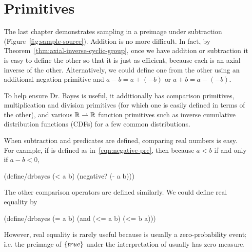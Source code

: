\section{Primitives}

The last chapter demonstrates sampling in a preimage under subtraction (Figure~\ref{fig:sample-source}).
Addition is no more difficult.
In fact, by Theorem~\ref{thm:axial-inverse-cyclic-group}, once we have addition or subtraction it is easy to define the other so that it is just as efficient, because each is an axial inverse of the other.
Alternatively, we could define one from the other using an additional negation primitive and $a - b = a + (-b)$ or $a + b = a - (-b)$.

To help ensure Dr. Bayes is useful, it additionally has comparison primitives, multiplication and division primitives (for which one is easily defined in terms of the other), and various $\mathbb{R} \rightharpoonup \mathbb{R}$ function primitives such as inverse cumulative distribution functions (CDFs) for a few common distributions.

When subtraction and predicates are defined, comparing real numbers is easy.
For example, if  is defined as in~\eqref{eqn:negative-pre}, then because $a < b$ if and only if $a - b < 0$,
\begin{center}\singlespacing
\begin{schemedisplay}
(define/drbayes (< a b)
  (negative? (- a b)))
\end{schemedisplay}
\end{center}
The other comparison operators are defined similarly.
We could define real equality by
\begin{center}\singlespacing
\begin{schemedisplay}
(define/drbayes (= a b)
  (and (<= a b) (<= b a)))
\end{schemedisplay}
\end{center}
However, real equality is rarely useful because  is usually a zero-probability event; i.e. the preimage of $\{{true}\}$ under the interpretation of  usually has zero measure.

